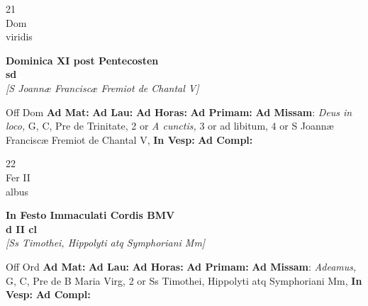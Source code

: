 \documentclass[10pt, openany]{book}
\begin{document}
        \begin{center}
            \begin{minipage}{3.5in}
                \vspace{2em}
                \begin{minipage}{0.5in}
                    {\Huge 21} \\
                    {\normalsize Dom} \\
                    {\normalsize viridis}
                \end{minipage}
                \begin{minipage}{3.0in}
                    \textbf{ \large Dominica XI post Pentecosten \\
                    \textnormal{\normalsize sd}} \\ \textit{[S Joannæ Franciscæ Fremiot de Chantal V]} \\ 
                \end{minipage}
                \begin{justify}Off Dom
                    \textbf{Ad Mat: }
                    \textbf{Ad Lau: }
                    \textbf{Ad Horas: }
                    \textbf{Ad Primam: }\textbf{Ad Missam}: \textit{Deus in loco,} G, C, Pre de Trinitate, 2 or \textit{A cunctis,} 3 or ad libitum, 4 or S Joannæ Franciscæ Fremiot de Chantal V,  
                    \textbf{In Vesp: }
                    \textbf{Ad Compl: }
                \end{justify}
            \end{minipage}
        \end{center}
    
        \begin{center}
            \begin{minipage}{3.5in}
                \vspace{2em}
                \begin{minipage}{0.5in}
                    {\Huge 22} \\
                    {\normalsize Fer II} \\
                    {\normalsize albus}
                \end{minipage}
                \begin{minipage}{3.0in}
                    \textbf{ \large In Festo Immaculati Cordis BMV \\
                    \textnormal{\normalsize d II cl}} \\ \textit{[Ss Timothei, Hippolyti atq Symphoriani Mm]} \\ 
                \end{minipage}
                \begin{justify}Off Ord
                    \textbf{Ad Mat: }
                    \textbf{Ad Lau: }
                    \textbf{Ad Horas: }
                    \textbf{Ad Primam: }\textbf{Ad Missam}: \textit{Adeamus,} G, C, Pre de B Maria Virg, 2 or Ss Timothei, Hippolyti atq Symphoriani Mm,  
                    \textbf{In Vesp: }
                    \textbf{Ad Compl: }
                \end{justify}
            \end{minipage}
        \end{center}
    
\end{document}
